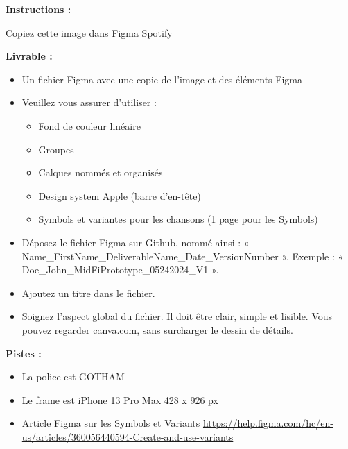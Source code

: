 \makeheaderfiles

\textbf{Instructions :}

Copiez cette image dans Figma
Spotify

\textbf{Livrable :}

\begin{itemize}
\item Un fichier Figma avec une copie de l'image et des éléments Figma
\item Veuillez vous assurer d'utiliser :
\begin{itemize}
\item Fond de couleur linéaire
\item Groupes
\item Calques nommés et organisés
\item Design system Apple (barre d'en-tête)
\item Symbols et variantes pour les chansons (1 page pour les Symbols)
\end{itemize}
\item Déposez le fichier Figma sur Github, nommé ainsi : « Name\_FirstName\_DeliverableName\_Date\_VersionNumber ». Exemple : « Doe\_John\_MidFiPrototype\_05242024\_V1 ».
\item Ajoutez un titre dans le fichier.
\item Soignez l'aspect global du fichier. Il doit être clair, simple et lisible. Vous pouvez regarder canva.com, sans surcharger le dessin de détails.
\end{itemize}

\textbf{Pistes :}

\begin{itemize}
\item La police est GOTHAM
\item Le frame est iPhone 13 Pro Max 428 x 926 px
\item Article Figma sur les Symbols et Variants \url{https://help.figma.com/hc/en-us/articles/360056440594-Create-and-use-variants}
\end{itemize}


